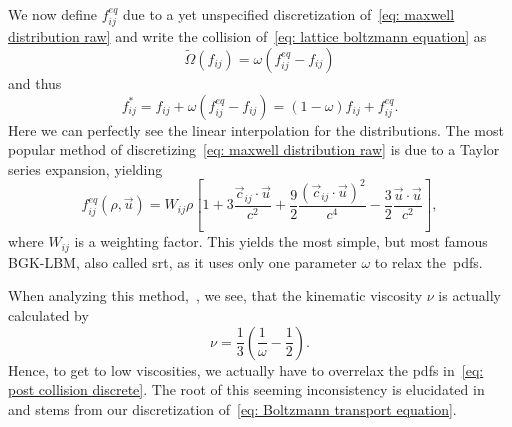 We now define $f_{ij}^{eq}$ due to a yet unspecified discretization of~\eqref{eq: maxwell distribution raw} and write the collision of~\eqref{eq: lattice boltzmann equation} as
\begin{equation}
  \tilde{\Omega}(f_{ij}) = \omega \left(f_{ij}^{eq} - f_{ij}\right)
\end{equation}
and thus
\begin{equation}
  \label{eq: post collision discrete}
  f_{ij}^* = f_{ij} + \omega \left(f_{ij}^{eq} - f_{ij}\right) = (1-\omega)f_{ij} + f_{ij}^{eq}.
\end{equation}
Here we can perfectly see the linear interpolation for the distributions.
The most popular method of discretizing~\eqref{eq: maxwell distribution raw} is due to a Taylor series expansion, yielding
\begin{equation}
  f_{ij}^{eq}(\rho,\vec{u}) = W_{ij}\rho
  \left[
    1
    + 3\frac{\vec{c}_{ij} \cdot \vec{u}}{c^2}
    + \frac{9}{2}\frac{{(\vec{c}_{ij} \cdot \vec{u})}^2}{c^4}
    - \frac{3}{2}\frac{\vec{u} \cdot \vec{u}}{c^2}
  \right],
\end{equation}
where $W_{ij}$ is a weighting factor.
This yields the most simple, but most famous BGK-LBM, also called \gls{srt}, as it uses only one parameter $\omega$ to relax the~\glspl{pdf}.

When analyzing this method,~\cite[Section 5.2.3]{wolf2000lattice}, we see, that the kinematic viscosity $\nu$ is actually calculated by
\begin{equation}
  \nu = \frac{1}{3}\left(\frac{1}{\omega} - \frac{1}{2}\right).
\end{equation}
Hence, to get to low viscosities, we actually have to overrelax the \glspl{pdf} in~\eqref{eq: post collision discrete}.
The root of this seeming inconsistency is elucidated in~\cite[Section 4]{karlin2006elements} and stems from our discretization of~\eqref{eq: Boltzmann transport equation}.

